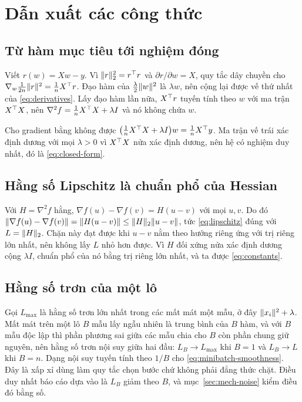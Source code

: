 \chapter{Dẫn xuất các công thức}
\label{app:derivations}

\section{Từ hàm mục tiêu tới nghiệm đóng}

Viết $r(w) = Xw - y$. Vì
$\lVert r\rVert_{2}^{2} = r^{\top} r$ và $\partial r / \partial w = X$, quy tắc dây
chuyền cho $\nabla_w \tfrac{1}{2n}\lVert r\rVert^{2} = \tfrac{1}{n} X^{\top} r$. Đạo hàm
của $\tfrac{\lambda}{2}\lVert w\rVert^{2}$ là $\lambda w$, nên cộng lại được vế thứ
nhất của \eqref{eq:derivatives}. Lấy đạo hàm lần nữa, $X^{\top} r$ tuyến tính theo
$w$ với ma trận $X^{\top} X$, nên $\nabla^{2} f = \tfrac{1}{n} X^{\top} X + \lambda I$
và nó không chứa $w$.

Cho gradient bằng không được
$\bigl(\tfrac{1}{n} X^{\top} X + \lambda I\bigr) w = \tfrac{1}{n} X^{\top} y$. Ma
trận vế trái xác định dương với mọi $\lambda > 0$ vì $X^{\top} X$ nửa xác định
dương, nên hệ có nghiệm duy nhất, đó là \eqref{eq:closed-form}.

\section{Hằng số Lipschitz là chuẩn phổ của Hessian}

Với $H = \nabla^{2} f$ hằng, $\nabla f(u) - \nabla f(v) = H(u-v)$ với mọi $u, v$.
Do đó $\lVert\nabla f(u) - \nabla f(v)\rVert = \lVert H(u-v)\rVert \le \lVert H\rVert_{2} \lVert u-v\rVert$,
tức \eqref{eq:lipschitz} đúng với $L = \lVert H\rVert_{2}$. Chặn này đạt được khi
$u - v$ nằm theo hướng riêng ứng với trị riêng lớn nhất, nên không lấy $L$ nhỏ
hơn được. Vì $H$ đối xứng nửa xác định dương cộng $\lambda I$, chuẩn phổ của nó
bằng trị riêng lớn nhất, và ta được \eqref{eq:constants}.

\section{Hằng số trơn của một lô}

Gọi $L_{\max}$ là hằng số trơn lớn nhất trong các mất mát một mẫu, ở đây
$\lVert x_i\rVert^{2} + \lambda$. Mất mát trên một lô $B$ mẫu lấy ngẫu nhiên là trung
bình của $B$ hàm, và với $B$ mẫu độc lập thì phần phương sai giữa các mẫu chia
cho $B$ còn phần chung giữ nguyên, nên hằng số trơn nội suy giữa hai đầu:
$L_B \to L_{\max}$ khi $B = 1$ và $L_B \to L$ khi $B = n$. Dạng nội suy tuyến
tính theo $1/B$ cho \eqref{eq:minibatch-smoothness}. Đây là xấp xỉ dùng làm quy
tắc chọn bước chứ không phải đẳng thức chặt. Điều duy nhất báo cáo dựa vào là
$L_B$ giảm theo $B$, và mục~\ref{sec:mech-noise} kiểm điều đó bằng số.

